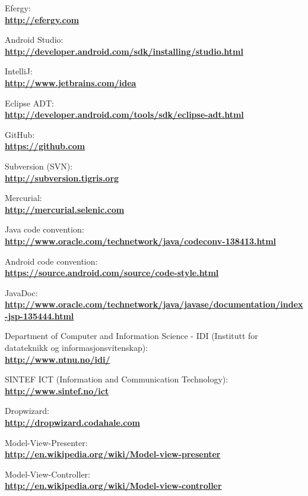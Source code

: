 \begin{thebibliography}{1}
 Efergy:\\
\textbf{ \url{http://efergy.com}}

 Android Studio:\\
\textbf{ \url{http://developer.android.com/sdk/installing/studio.html}}

 IntelliJ:\\
\textbf{ \url{http://www.jetbrains.com/idea}}

 Eclipse ADT:\\
\textbf{ \url{http://developer.android.com/tools/sdk/eclipse-adt.html}}

 GitHub:\\
\textbf{ \url{https://github.com}}

 Subversion (SVN):\\
\textbf{ \url{http://subversion.tigris.org}}

 Mercurial:\\
\textbf{ \url{http://mercurial.selenic.com}}

 Java code convention:\\
\textbf{ \url{http://www.oracle.com/technetwork/java/codeconv-138413.html}}

 Android code convention:\\
\textbf{ \url{https://source.android.com/source/code-style.html}}

 JavaDoc:\\
\textbf{ \url{http://www.oracle.com/technetwork/java/javase/documentation/index-jsp-135444.html}}

 Department of Computer and Information Science - IDI (Institutt for datateknikk og informasjonsvitenskap):\\
\textbf{ \url{http://www.ntnu.no/idi/}}

 SINTEF ICT (Information and Communication Technology): \\
\textbf{ \url{http://www.sintef.no/ict}}

 Dropwizard:\\
\textbf{ \url{http://dropwizard.codahale.com}}

 Model-View-Presenter:\\
\textbf{ \url{http://en.wikipedia.org/wiki/Model-view-presenter}}

 Model-View-Controller:\\
\textbf{ \url{http://en.wikipedia.org/wiki/Model-view-controller}}

\end{thebibliography}
